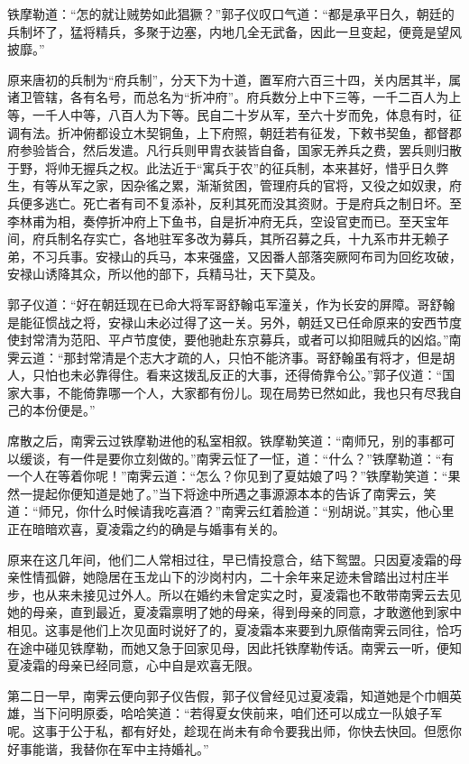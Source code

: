 \documentclass[12pt,oneside]{book}
\begin{document}
铁摩勒道：``怎的就让贼势如此猖獗？''郭子仪叹口气道：``都是承平日久，朝廷的兵制坏了，猛将精兵，多聚于边塞，内地几全无武备，因此一旦变起，便竟是望风披靡。''

原来唐初的兵制为``府兵制''，分天下为十道，置军府六百三十四，关内居其半，属诸卫管辖，各有名号，而总名为``折冲府''。府兵数分上中下三等，一千二百人为上等，一千人中等，八百人为下等。民自二十岁从军，至六十岁而免，体息有时，征调有法。折冲俯都设立木契铜鱼，上下府照，朝廷若有征发，下敕书契鱼，都督郡府参验皆合，然后发遣。凡行兵则甲胄衣装皆自备，国家无养兵之费，罢兵则归散于野，将帅无握兵之权。此法近于``寓兵于农''的征兵制，本来甚好，惜乎日久弊生，有等从军之家，因杂徭之累，渐渐贫困，管理府兵的官将，又役之如奴隶，府兵便多逃亡。死亡者有司不复添补，反利其死而没其资财。于是府兵之制日坏。至李林甫为相，奏停折冲府上下鱼书，自是折冲府无兵，空设官吏而已。至天宝年间，府兵制名存实亡，各地驻军多改为募兵，其所召募之兵，十九系市井无赖子弟，不习兵事。安禄山的兵马，本来强盛，又因番人部落突厥阿布司为回纥攻破，安禄山诱降其众，所以他的部下，兵精马壮，天下莫及。

郭子仪道：``好在朝廷现在已命大将军哥舒翰屯军潼关，作为长安的屏障。哥舒翰是能征惯战之将，安禄山未必过得了这一关。另外，朝廷又已任命原来的安西节度使封常清为范阳、平卢节度使，要他驰赴东京募兵，或者可以抑阻贼兵的凶焰。''南霁云道：``那封常清是个志大才疏的人，只怕不能济事。哥舒翰虽有将才，但是胡人，只怕也未必靠得住。看来这拨乱反正的大事，还得倚靠令公。''郭子仪道：``国家大事，不能倚靠哪一个人，大家都有份儿。现在局势已然如此，我也只有尽我自己的本份便是。''

席散之后，南霁云过铁摩勒进他的私室相叙。铁摩勒笑道：``南师兄，别的事都可以缓谈，有一件是要你立刻做的。''南霁云怔了一怔，道：``什么？''铁摩勒道：``有一个人在等着你呢！''南霁云道：``怎么？你见到了夏姑娘了吗？''铁摩勒笑道：``果然一提起你便知道是她了。''当下将途中所遇之事源源本本的告诉了南霁云，笑道：``师兄，你什么时候请我吃喜酒？''南霁云红着脸道：``别胡说。''其实，他心里正在暗暗欢喜，夏凌霜之约的确是与婚事有关的。

原来在这几年间，他们二人常相过往，早已情投意合，结下鸳盟。只因夏凌霜的母亲性情孤僻，她隐居在玉龙山下的沙岗村内，二十余年来足迹未曾踏出过村庄半步，也从来未接见过外人。所以在婚约未曾定实之时，夏凌霜也不敢带南霁云去见她的母亲，直到最近，夏凌霜禀明了她的母亲，得到母亲的同意，才敢邀他到家中相见。这事是他们上次见面时说好了的，夏凌霜本来要到九原偕南霁云同往，恰巧在途中碰见铁摩勒，而她又急于回家见母，因此托铁摩勒传话。南霁云一听，便知夏凌霜的母亲已经同意，心中自是欢喜无限。

第二日一早，南霁云便向郭子仪告假，郭子仪曾经见过夏凌霜，知道她是个巾帼英雄，当下问明原委，哈哈笑道：``若得夏女侠前来，咱们还可以成立一队娘子军呢。这事于公于私，都有好处，趁现在尚未有命令要我出师，你快去快回。但愿你好事能谐，我替你在军中主持婚礼。''
\end{document}
